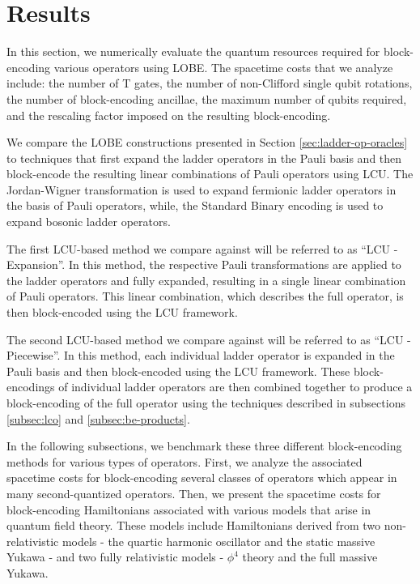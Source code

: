 \section{Results}
\label{sec:results}

In this section, we numerically evaluate the quantum resources required for block-encoding various operators using LOBE.
The spacetime costs that we analyze include: the number of T gates, the number of non-Clifford single qubit rotations, the number of block-encoding ancillae, the maximum number of qubits required, and the rescaling factor imposed on the resulting block-encoding.

We compare the LOBE constructions presented in Section \ref{sec:ladder-op-oracles} to techniques that first expand the ladder operators in the Pauli basis and then block-encode the resulting linear combinations of Pauli operators using LCU.
The Jordan-Wigner transformation \cite{jordan-wigner} is used to expand fermionic ladder operators in the basis of Pauli operators, while, the Standard Binary encoding \cite{standard-binary} is used to expand bosonic ladder operators.

The first LCU-based method we compare against will be referred to as ``LCU - Expansion''.
In this method, the respective Pauli transformations are applied to the ladder operators and fully expanded, resulting in a single linear combination of Pauli operators.
This linear combination, which describes the full operator, is then block-encoded using the LCU framework.

The second LCU-based method we compare against will be referred to as ``LCU - Piecewise''.
In this method, each individual ladder operator is expanded in the Pauli basis and then block-encoded using the LCU framework.
These block-encodings of individual ladder operators are then combined together to produce a block-encoding of the full operator using the techniques described in subsections \ref{subsec:lco} and \ref{subsec:be-products}.

In the following subsections, we benchmark these three different block-encoding methods for various types of operators.
First, we analyze the associated spacetime costs for block-encoding several classes of operators which appear in many second-quantized operators.
Then, we present the spacetime costs for block-encoding Hamiltonians associated with various models that arise in quantum field theory.
These models include Hamiltonians derived from two non-relativistic models - the quartic harmonic oscillator and the static massive Yukawa - and two fully relativistic models - $\phi^4$ theory and the full massive Yukawa.

